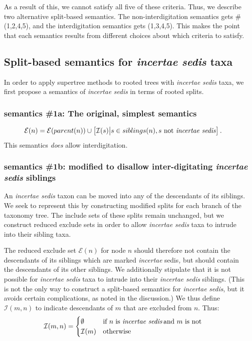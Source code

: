 \documentclass[english]{article}
\begin{document}
As a result of this, we cannot satisfy all five of these criteria. Thus, we
describe two alternative split-based semantics. The non-interdigitation
semantics gets \# (1,2,4,5), and the interdigitation semantics gets (1,3,4,5).
This makes the point that each semantics results from different choices about
which criteria to satisfy.

\subsection{Split-based semantics for \emph{incertae sedis} taxa}

In order to apply supertree methods to rooted trees with \emph{incertae sedis}
taxa, we first propose a semantics of \emph{incertae sedis }in terms of rooted
splits.

\subsubsection{semantics \#1a: The original, simplest semantics}
\begin{align}
    \mathcal{E}(n) & = \mathcal{E}(parent(n))\cup\left[\mathcal{I}(s)\big|s\in
           siblings(n), s \text{ not \emph{incertae sedis}}\right].\label{eq:exclude-set-formula-1a}
\end{align}
This semantics \emph{does} allow interdigitation.

\subsubsection{semantics \#1b: modified to disallow inter-digitating
\emph{incertae sedis} siblings}

An \emph{incertae sedis} taxon can be moved into any of the
descendants of its siblings.
We seek to represent this by constructing
modified splits for each branch of the taxonomy tree.
The include sets
of these splits remain unchanged, but we construct reduced exclude
sets in order to allow \emph{incertae sedis} taxa to intrude into
their sibling taxa.

The reduced exclude set $\mathcal{E}(n)$ for node $n$ should therefore
not contain the descendants of its siblings which are marked
\emph{incertae }sedis\emph{,} but should contain the descendants of
its other siblings\emph{.
}We additionally stipulate that it is not
possible for \emph{incertae sedis} taxa to intrude into their
\emph{incertae sedis} siblings.
(This is not the only way to construct
a split-based semantics for \emph{incertae sedis}, but it avoids
certain complications, as noted in the discussion.) We thus define
$\mathcal{I}(m,n)$ to indicate descendants of $m$ that are excluded
from $n$.
Thus:
\begin{align*}
\mathcal{I}(m,n) & =
    \begin{cases}
        \emptyset & \text{if }n\text{ is \emph{incertae sedis}\,and }m\text{
is not}\\
        \mathcal{I}(m) & \text{otherwise}
    \end{cases}
\end{align*}
\end{document}
